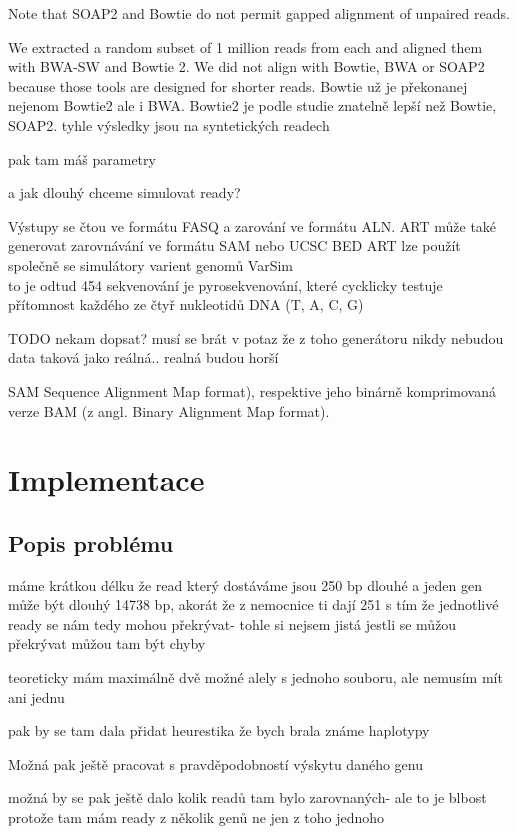 \documentclass[czech,DP]{thesiskiv}
\numberwithin{equation}{section}
\begin{document}
Note that SOAP2 and Bowtie do not permit gapped alignment of unpaired reads.

 We extracted a random subset of 1 million reads from each and aligned them with BWA-SW and Bowtie 2. We did not align with Bowtie, BWA or SOAP2 because those tools are designed for shorter reads.
Bowtie už je překonanej nejenom Bowtie2 ale i BWA.
Bowtie2 je podle studie znatelně lepší než Bowtie, SOAP2.
tyhle výsledky jsou na syntetických readech


pak tam máš parametry 

a jak dlouhý chceme simulovat ready? 

Výstupy se čtou ve formátu FASQ a zarování ve formátu ALN. 
ART může také generovat zarovnávání ve formátu SAM nebo UCSC BED
ART lze použít společně se simulátory varient genomů VarSim 
\\
to je odtud %
454 sekvenování je pyrosekvenování, které cycklicky testuje přítomnost každého ze čtyř nukleotidů DNA (T, A, C, G)


TODO nekam dopsat? musí se brát v potaz že z toho generátoru nikdy nebudou data taková jako reálná.. realná budou horší 


SAM Sequence Alignment Map format), respektive jeho binárně
komprimovaná verze BAM (z angl. Binary Alignment Map format).


\chapter{Implementace}
\section{Popis problému}
máme krátkou délku
že read který dostáváme jsou 250 bp dlouhé a jeden gen může být dlouhý 14738 bp, akorát že z nemocnice ti dají 251
s tím že jednotlivé ready se nám tedy mohou překrývat- tohle si nejsem jistá jestli se můžou překrývat
můžou tam být chyby

teoreticky mám maximálně dvě možné alely s jednoho souboru, ale nemusím mít ani jednu 

pak by se tam dala přidat heurestika že bych brala známe haplotypy

Možná pak ještě pracovat s pravděpodobností výskytu daného genu

možná by se pak ještě dalo kolik readů tam bylo zarovnaných- ale to je blbost protože tam mám ready z několik genů ne jen z toho jednoho 
\end{document}
